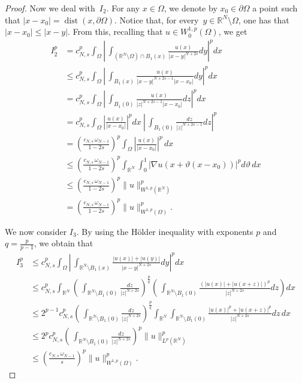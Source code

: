 \documentclass[12pt,a4paper,intlimits,sumlimits]{amsart}
\def \R {\mathbb{R}}
\theoremstyle{definition}
\theoremstyle{plain}
\numberwithin{equation}{section}
\renewcommand{\leq}{\leqslant}
\renewcommand{\le}{\leqslant}
\begin{document}
\begin{proof}
Now we deal with~$I_2$.
For any $x\in \Omega$, we denote by $x_0\in \partial \Omega$ a point such that $|x-x_0|=\operatorname{dist}(x,\partial\Omega)$. 
Notice that, for every~$y\in \R^N\setminus \Omega $, one has that~$|x-x_0|\le |x-y|$.
From this, recalling that $u\in W^{1,p}_0(\Omega)$, we get
\begin{equation}\label{zserfgyuhnjkop4}
\begin{aligned}
I_2^p&=c_{N,s}^p\int_\Omega\left|\,\int_{(\R^N\setminus \Omega)\cap B_1(x)}\frac{u(x)}{|x-y|^{N+2s}}dy\right|^p dx \\
&\le c_{N,s}^p\int_\Omega\left|\,\int_{ B_1(x)}\frac{u(x)}{|x-y|^{N+2s-1}|x-x_0|}dy\right|^p dx \\
&= c_{N,s}^p\int_\Omega\left|\,\int_{ B_1(0)}\frac{u(x)}{|z|^{N+2s-1}|x-x_0|}dz\right|^p dx \\
&= c_{N,s}^p\int_\Omega\left|\frac{u(x)}{|x-x_0|}\right|^p dx \ \left|\,\int_{B_1(0)}\frac{dz}{|z|^{N+2s-1}}dz\right|^p   \\
&=\left(\frac{c_{N,s}\,\omega_{N-1}}{1-2s}\right)^p\int_\Omega\left|\frac{u(x)}{|x-x_0|}\right|^p\,dx \\
&\leq \left(\frac{c_{N,s}\,\omega_{N-1}}{1-2s}\right)^p\int_{\R^N}\int_0^1 |\nabla u(x+\vartheta(x-x_0))|^p d\vartheta \,dx \\
&\leq \left(\frac{c_{N,s}\,\omega_{N-1}}{1-2s}\right)^p \|u\|_{W^{1,p}(\R^N)}^p\\&= \left(\frac{c_{N,s}\,\omega_{N-1}}{1-2s}\right)^p\|u\|_{W^{1,p}(\Omega)}^p.
\end{aligned}
\end{equation}

We now consider $I_3$.  By using
the H\"older inequality with exponents $p$ and $q=\frac{p}{p-1}$,  we obtain that
\begin{equation}\label{zserfgyuhnjkop5}
\begin{aligned}
I_3^p&\leq c_{N,s}^p\int_\Omega\left|\,\int_{\R^N\setminus B_1(x)}\frac{|u(x)|+|u(y)|}{|x-y|^{N+2s}}dy\right|^p dx \\
&\leq c_{N,s}^p\int_{\R^N}\left(\,\int_{\R^N\setminus B_1(0)}\frac{dz}{|z|^{N+2s}}\right)^\frac{p}{q}\left(\,\int_{\R^N\setminus B_1(0)}\frac{(|u(x)|+|u(x+z)|)^p}{|z|^{N+2s}}dz\right)dx \\
&\leq 2^{p-1}c_{N,s}^p\left(\,\int_{\R^N\setminus B_1(0)}\frac{dz}{|z|^{N+2s}}\right)^\frac{p}{q}\int_{\R^N}\int_{\R^N\setminus B_1(0)}\frac{|u(x)|^p+|u(x+z)|^p}{|z|^{N+2s}}dz\,dx \\
&\leq 2^pc_{N,s}^p\left(\,\int_{\R^N\setminus B_1(0)}\frac{dz}{|z|^{N+2s}}\right)^p \|u\|_{L^p(\R^N)}^p\\&\le\left(\frac{ c_{N,s}\,\omega_{N-1} }{s}\right)^p\|u\|_{W^{1,p}(\Omega)}^p.
\end{aligned}
\end{equation}


\end{proof}
\end{document}
